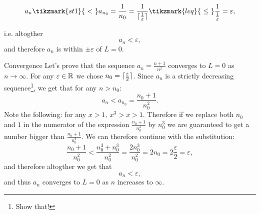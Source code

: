 \vspace{2em}
\begin{equation}
	a_{n} \tikzmark{st1}{\ <\ } a_{n_{0}} = \frac{1}{n_{0}} = \frac{1}{\ceil{\frac{1}{\varepsilon}}} \tikzmark{leq}{\ \leq\ } \frac{1}{\frac{1}{\varepsilon}} = \varepsilon,
\end{equation}

\vspace{2em}
i.e. altogther
\begin{equation}
	a_{n} < \varepsilon,
\end{equation}
and therefore $a_{n}$ is within $\pm\varepsilon$ of $L=0$.

\begin{example}{Convergence}{}
	Let's prove that the sequence $a_{n}=\frac{n+1}{n^{2}}$ converges to $L=0$ as $n\to\infty$. For any $\varepsilon\in\mathbb{R}^{}$ we chose $n_{0}=\lceil \frac{\varepsilon}{2} \rceil$. Since $a_{n}$ is a strictly decreasing sequence\footnote{Show that!}, we get that for any $n>n_{0}$:
	\[
		a_{n} < a_{n_{0}} = \frac{n_{0}+1}{n_{0}^{2}}.
	\]
	Note the following: for any $x>1,\ x^{3}>x>1$. Therefore if we replace both $n_{0}$ and $1$ in the numerator of the expression $\frac{n_{0}+1}{n_{0}^{2}}$ by $n_{0}^{3}$ we are guaranteed to get a number bigger than $\frac{n_{0}+1}{n_{0}^{2}}$. We can therefore continue with the substitution:
	\[
		\frac{n_{0}+1}{n_{0}^{2}} < \frac{n_{0}^{3}+n_{0}^{3}}{n_{0}^{2}} = \frac{2n_{0}^{3}}{n_{0}^{2}} = 2n_{0} = 2\frac{\varepsilon}{2} = \varepsilon,
	\]
	and therefore altogther we get that
	\[
		a_{n} < \varepsilon,
	\]
	and thus $a_{n}$ converges to $L=0$ as $n$ increases to $\infty$.
\end{example}
